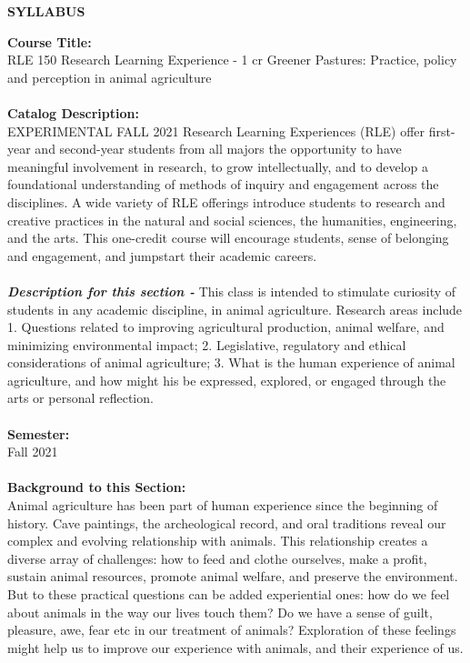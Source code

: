 \documentclass[11pt]{article}
\begin{document}
\sloppy \rmfamily
\begin{center}\textbf{SYLLABUS}\end{center}
\textbf{Course Title:}\\
RLE 150  Research Learning Experience  - 1 cr Greener Pastures: Practice, policy and perception in animal agriculture\\~\\
\textbf{Catalog Description:}\\
	
\noindent EXPERIMENTAL FALL 2021
Research Learning Experiences (RLE) offer first-year and second-year students from all majors the opportunity to have meaningful involvement in research, to grow intellectually, and to develop a foundational understanding of methods of inquiry and engagement across the disciplines. A wide variety of RLE offerings introduce students to research and creative practices in the natural and social sciences, the humanities, engineering, and the arts. This one-credit course will encourage students, sense of belonging and engagement, and jumpstart their academic careers.\\~\\
\textbf{\emph{Description for this section -}} This class is intended to stimulate curiosity of students in any academic discipline,  in animal agriculture. Research areas include 1. Questions related to improving agricultural production, animal welfare, and minimizing environmental impact; 2. Legislative, regulatory and ethical considerations of animal agriculture; 3. What is the human experience of animal agriculture, and how might his be expressed, explored, or engaged through the arts or personal reflection.\\~\\
\textbf{Semester:}\\Fall 2021\\~\\
\textbf{Background to this Section:}\\  Animal agriculture has been part of human experience since the beginning of history. Cave paintings, the archeological record, and oral traditions reveal our complex and evolving relationship with animals. This relationship creates a diverse array of challenges: how to feed and clothe ourselves, make a profit, sustain animal resources, promote animal welfare, and preserve the environment. But to these practical questions can be added experiential ones: how do we feel about animals in the way our lives touch them? Do we have a sense of guilt, pleasure, awe, fear etc in our treatment of animals? Exploration of these feelings might help us to improve our experience with animals, and their experience of us.\\~\\
\end{document}
